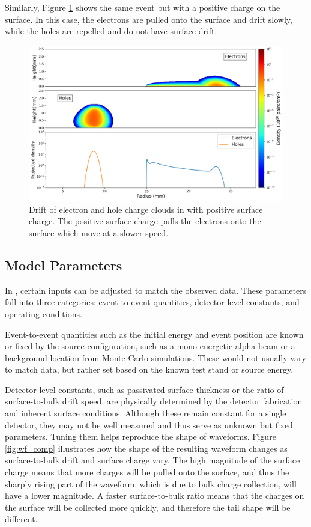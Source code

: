 Similarly, Figure \ref{ch3_fig_ehd_path_pd_sc_pos_0p3} shows the same event but with a positive charge on the surface. In this case, the electrons are pulled onto the surface and drift slowly, while the holes are repelled and do not have surface drift. 

\begin{figure}%
    \includegraphics[trim={0cm 0 0cm 0},clip,width=0.99\linewidth]{ch3/figs/drift_path_sc=0.3.png}
    \caption{Drift of electron and hole charge clouds in {\ehd} with positive surface charge. The positive surface charge pulls the electrons onto the surface which move at a slower speed.}
    \label{ch3_fig_ehd_path_pd_sc_pos_0p3}
\end{figure}


\subsection{Model Parameters}
In {\ehd}, certain inputs can be adjusted to match the observed data. These parameters fall into three categories: event-to-event quantities, detector-level constants, and operating conditions.

Event-to-event quantities such as the initial energy and event position are known or fixed by the source configuration, such as a mono-energetic alpha beam or a background location from Monte Carlo simulations. These would not usually vary to match data, but rather set based on the known test stand or source energy.

Detector-level constants, such as passivated surface thickness or the ratio of surface-to-bulk drift speed, are physically determined by the detector fabrication and inherent surface conditions. Although these remain constant for a single detector, they may not be well measured and thus serve as unknown but fixed parameters. Tuning them helps reproduce the shape of waveforms. Figure \ref{fig:wf_comp} illustrates how the shape of the resulting waveform changes as surface-to-bulk drift and surface charge vary. The high magnitude of the surface charge means that more charges will be pulled onto the surface, and thus the sharply rising part of the waveform, which is due to bulk charge collection, will have a lower magnitude. A faster surface-to-bulk ratio means that the charges on the surface will be collected more quickly, and therefore the tail shape will be different.

